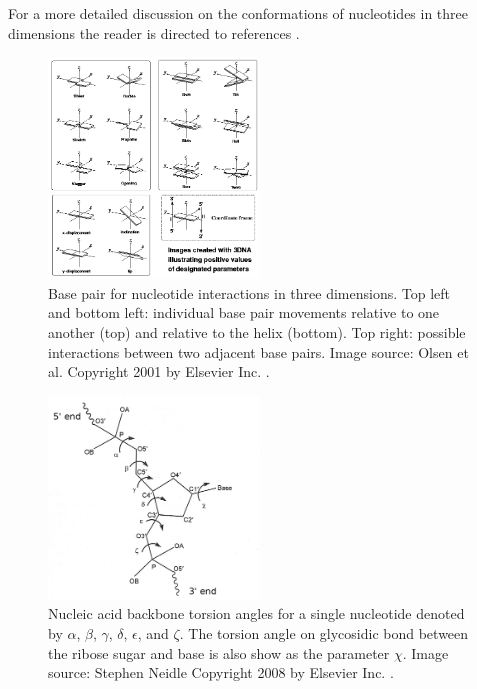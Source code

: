 \documentclass[journal]{IEEEtran}
\begin{document}
 For a more detailed discussion on the conformations of nucleotides in three dimensions the reader is directed to references \cite{neidle2010principles, schlick2010molecular, nowakowski1997rna}.

\begin{figure}[t]
\centering
\includegraphics[width=0.5\textwidth]{img/base_pair_interactions.png}
\caption{Base pair for nucleotide interactions in three dimensions. Top left and bottom left: individual base pair movements relative to one another (top) and relative to the helix (bottom). Top right: possible interactions between two adjacent base pairs. Image source: Olsen et al. Copyright 2001 by Elsevier Inc. \cite{Olson2001229}.}
\label{fig:base-pair-interactions}
\end{figure}

\begin{figure}[t]
\centering
\includegraphics[width=0.5\textwidth]{img/backbone_torsion_angles.png}
\caption{Nucleic acid backbone torsion angles for a single nucleotide denoted by $\alpha$, $\beta$, $\gamma$, $\delta$, $\epsilon$, and $\zeta$. The torsion angle on glycosidic bond between the ribose sugar and base is also show as the parameter $\chi$. Image source: Stephen Neidle Copyright 2008 by Elsevier Inc. \cite{neidle2010principles}.}
\label{fig:backbone-torsion-angles}
\end{figure}
\end{document}
